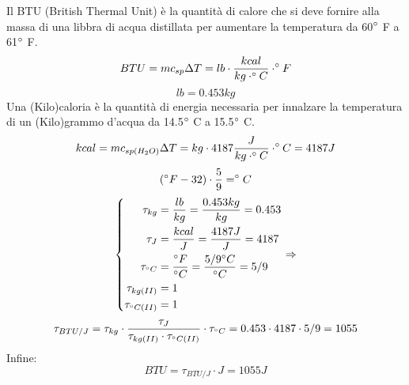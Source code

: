 \documentclass[a4paper, 15pt]{article}
\begin{document}
 	Il BTU (British Thermal Unit) è la quantità di calore che si deve fornire alla massa di una libbra di acqua distillata per aumentare la temperatura da 60$\degree$ F a 61$\degree$ F. 
 	\[ BTU = mc_{sp}\Delta T = lb \cdot \dfrac{kcal}{kg\cdot\degree C} \cdot \degree F \]
 	\[ lb = 0.453kg \]
 	Una (Kilo)caloria è la quantità di energia necessaria per innalzare la temperatura di un (Kilo)grammo d'acqua da 14.5$\degree$ C a 15.5$\degree$ C.
 	\[ kcal = mc_{sp(H_2O)}\Delta T = kg\cdot 4187\dfrac{J}{kg\cdot\degree C} \cdot \degree C = 4187J\]
 	\[ (\degree F - 32)\cdot\dfrac{5}{9} = \degree C \] 
 	\[  \begin{dcases}
 		\begin{aligned}
	\tau_{kg}& = \dfrac{lb}{kg} =\dfrac{0.453kg}{kg} = 0.453 \\
	\tau_{J} &= \dfrac{kcal}{J} = \dfrac{4187J}{J} = 4187 \\
	\tau_{\degree C} &= \dfrac{\degree F}{\degree C} = \dfrac{5/9\degree C}{\degree C} = 5/9 \\
	\tau_{kg(II)} &= 1 \\
	\tau_{\degree C(II)} &= 1
 		\end{aligned} 		
 	\end{dcases} \Rightarrow  \]
 	\[\tau_{BTU/J}= \tau_{kg} \cdot \dfrac{\tau_{J}}{\tau_{kg(II)}\cdot \tau_{\degree C(II)}} \cdot \tau_{\degree C} = 0.453\cdot 4187 \cdot 5/9 = 1055\]
 	Infine: 
 	\[ BTU = \tau_{BTU/J} \cdot J = 1055J\]
 	
 	\newpage
\end{document}
